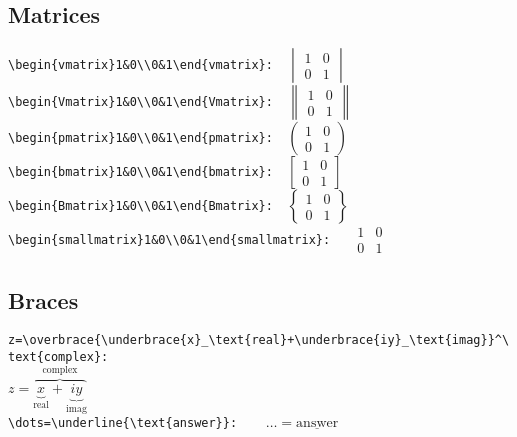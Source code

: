 \documentclass{article}
\begin{document}
\subsection{Matrices}
    \verb|\begin{vmatrix}1&0\\0&1\end{vmatrix}:  |$\begin{vmatrix}1&0\\0&1\end{vmatrix}$ \\
    \verb|\begin{Vmatrix}1&0\\0&1\end{Vmatrix}:  |$\begin{Vmatrix}1&0\\0&1\end{Vmatrix}$ \\
    \verb|\begin{pmatrix}1&0\\0&1\end{pmatrix}:  |$\begin{pmatrix}1&0\\0&1\end{pmatrix}$ \\
    \verb|\begin{bmatrix}1&0\\0&1\end{bmatrix}:  |$\begin{bmatrix}1&0\\0&1\end{bmatrix}$ \\
    \verb|\begin{Bmatrix}1&0\\0&1\end{Bmatrix}:  |$\begin{Bmatrix}1&0\\0&1\end{Bmatrix}$ \\
    \verb|\begin{smallmatrix}1&0\\0&1\end{smallmatrix}:   |$\begin{smallmatrix}1&0\\0&1\end{smallmatrix}$ \\

\subsection{Braces}
   \verb|z=\overbrace{\underbrace{x}_\text{real}+\underbrace{iy}_\text{imag}}^\text{complex}:|\\
   $z=\overbrace{\underbrace{x}_\text{real}+\underbrace{iy}_\text{imag}}^\text{complex}$\\
   \verb|\dots=\underline{\text{answer}}:    |$\dots=\underline{\text{answer}}$
\end{document}
